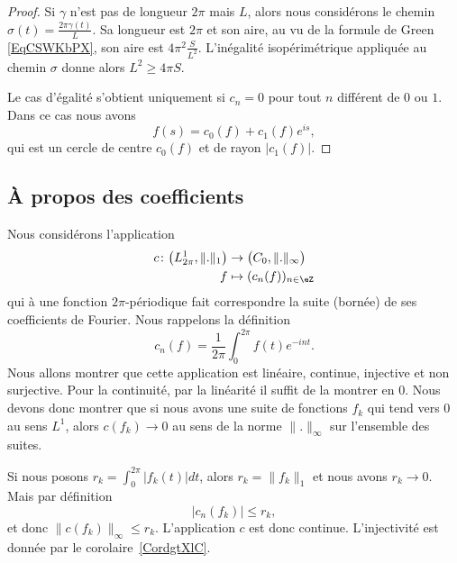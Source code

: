 \begin{proof}
    Si \( \gamma\) n'est pas de longueur \( 2\pi\) mais \( L\), alors nous considérons le chemin \( \sigma(t)=\frac{ 2\pi\gamma(t) }{ L }\). Sa longueur est \( 2\pi\) et son aire, au vu de la formule de Green \eqref{EqCSWKbPX}, son aire est \( 4\pi^2\frac{ S }{ L^2 }\). L'inégalité isopérimétrique appliquée au chemin \( \sigma\) donne alors \( L^2\geq 4\pi S\).

    Le cas d'égalité s'obtient uniquement si \( c_n=0\) pour tout \( n\) différent de \( 0\) ou \( 1\). Dans ce cas nous avons
    \begin{equation}
        f(s)=c_0(f)+c_1(f) e^{is},
    \end{equation}
    qui est un cercle de centre \( c_0(f)\) et de rayon \( | c_1(f) |\).
\end{proof}

\subsection{À propos des coefficients}

Nous considérons l'application
\begin{equation}
    \begin{aligned}
        c\colon \big( L^1_{2\pi},\| . \|_1 \big)&\to \big( C_0,\| .\|_{\infty} \big) \\
        f&\mapsto (c_n(f))_{n\in \eZ}
    \end{aligned}
\end{equation}
qui à une fonction \( 2\pi\)-périodique fait correspondre la suite (bornée) de ses coefficients de Fourier. Nous rappelons la définition
\begin{equation}
    c_n(f)=\frac{1}{ 2\pi }\int_0^{2\pi}f(t) e^{-int}.
\end{equation}
Nous allons montrer que cette application est linéaire, continue, injective et non surjective. Pour la continuité, par la linéarité il suffit de la montrer en \( 0\). Nous devons donc montrer que si nous avons une suite de fonctions \( f_k\) qui tend vers \( 0\) au sens \( L^1\), alors \( c(f_k)\to 0\) au sens de la norme \( \| . \|_{\infty}\) sur l'ensemble des suites.

Si nous posons \( r_k=\int_0^{2\pi}| f_k(t) |dt\), alors \( r_k=\| f_k \|_1\) et nous avons \( r_k\to 0\). Mais par définition
\begin{equation}
    | c_n(f_k) |\leq r_k,
\end{equation}
et donc \( \| c(f_k) \|_{\infty}\leq r_k\). L'application \( c\) est donc continue. L'injectivité est donnée par le corolaire~\ref{CordgtXlC}.

